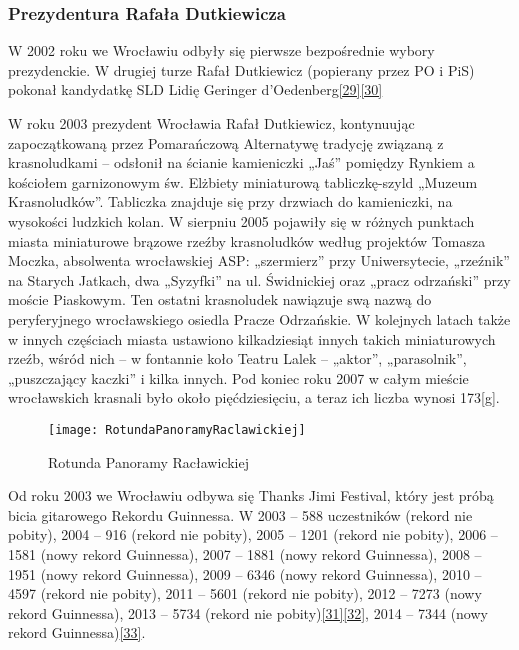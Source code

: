 \documentclass{article}
\begin{document}
\subsubsection*{Prezydentura Rafała Dutkiewicza}
W 2002 roku we Wrocławiu odbyły się pierwsze bezpośrednie wybory prezydenckie. W drugiej turze Rafał Dutkiewicz (popierany przez PO i PiS) pokonał kandydatkę SLD Lidię Geringer d’Oedenberg\hyperref[29]{[29]}\label{229}\hyperref[30]{[30]}\label{330}

\vspace{6pt}

\noindent W roku 2003 prezydent Wrocławia Rafał Dutkiewicz, kontynuując zapoczątkowaną przez Pomarańczową Alternatywę tradycję związaną z krasnoludkami – odsłonił na ścianie kamieniczki „Jaś” pomiędzy Rynkiem a kościołem garnizonowym św. Elżbiety miniaturową tabliczkę-szyld „Muzeum Krasnoludków”. Tabliczka znajduje się przy drzwiach do kamieniczki, na wysokości ludzkich kolan. W sierpniu 2005 pojawiły się w różnych punktach miasta miniaturowe brązowe rzeźby krasnoludków według projektów Tomasza Moczka, absolwenta wrocławskiej ASP: „szermierz” przy Uniwersytecie, „rzeźnik” na Starych Jatkach, dwa „Syzyfki” na ul. Świdnickiej oraz „pracz odrzański” przy moście Piaskowym. Ten ostatni krasnoludek nawiązuje swą nazwą do peryferyjnego wrocławskiego osiedla Pracze Odrzańskie. W kolejnych latach także w innych częściach miasta ustawiono kilkadziesiąt innych takich miniaturowych rzeźb, wśród nich – w fontannie koło Teatru Lalek – „aktor”, „parasolnik”, „puszczający kaczki” i kilka innych. Pod koniec roku 2007 w całym mieście wrocławskich krasnali było około pięćdziesięciu, a teraz ich liczba wynosi 173[g].

\begin{figure}[h]
\centering

\texttt{[image: RotundaPanoramyRaclawickiej]}
\caption{Rotunda Panoramy Racławickiej}
\label{rysunek16}

\end{figure}

\noindent Od roku 2003 we Wrocławiu odbywa się Thanks Jimi Festival, który jest próbą bicia gitarowego Rekordu Guinnessa. W 2003 – 588 uczestników (rekord nie pobity), 2004 – 916 (rekord nie pobity), 2005 – 1201 (rekord nie pobity), 2006 – 1581 (nowy rekord Guinnessa), 2007 – 1881 (nowy rekord Guinnessa), 2008 – 1951 (nowy rekord Guinnessa), 2009 – 6346 (nowy rekord Guinnessa), 2010 – 4597 (rekord nie pobity), 2011 – 5601 (rekord nie pobity), 2012 – 7273 (nowy rekord Guinnessa), 2013 – 5734 (rekord nie pobity)\hyperref[31]{[31]}\label{331}\hyperref[32]{[32]}\label{332}, 2014 – 7344 (nowy rekord Guinnessa)\hyperref[33]{[33]}\label{333}.
\end{document}
